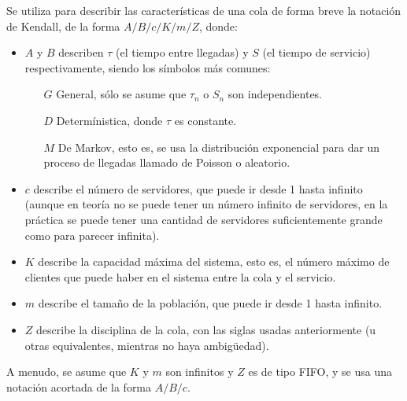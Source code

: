 \documentclass[a4paper,10pt]{scrartcl}
\theoremstyle{definition}
\numberwithin{equation}{section}
\begin{document}
Se utiliza para describir las características de una cola de forma breve la notación de Kendall, de la forma $A/B/c/K/m/Z$, donde:
\begin{itemize}
\item $A$ y $B$ describen $\tau$ (el tiempo entre llegadas) y $S$ (el tiempo de servicio) respectivamente, siendo los símbolos más comunes:
  \begin{itemize}
  \item [$G$]
    General, sólo se asume que $\tau_n$ o $S_n$ son independientes.
  \item [$D$]
    Determínistica, donde $\tau$ es constante.
  \item [$M$]
    De Markov, esto es, se usa la distribución exponencial para dar un proceso de llegadas llamado de Poisson o aleatorio.
  \end{itemize}
\item $c$ describe el número de servidores, que puede ir desde 1 hasta infinito (aunque en teoría no se puede tener un número infinito de servidores, en la práctica se puede tener una cantidad de servidores suficientemente grande como para parecer infinita).
\item $K$ describe la capacidad máxima del sistema, esto es, el número máximo de clientes que puede haber en el sistema entre la cola y el servicio.
\item $m$ describe el tamaño de la población, que puede ir desde 1 hasta infinito.
\item $Z$ describe la disciplina de la cola, con las siglas usadas anteriormente (u otras equivalentes, mientras no haya ambigüedad).
\end{itemize}

A menudo, se asume que $K$ y $m$ son infinitos y $Z$ es de tipo FIFO, y se usa una notación acortada de la forma $A/B/c$.
\end{document}
